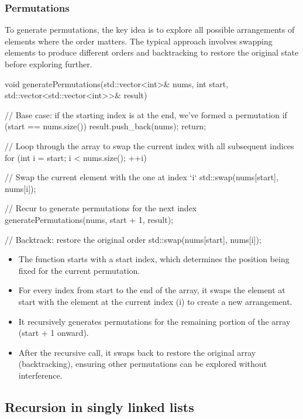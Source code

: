 \documentclass{report}
\begin{document}
\subsubsection{Permutations}
\bigbreak \noindent 
To generate permutations, the key idea is to explore all possible arrangements of elements where the order matters. The typical approach involves swapping elements to produce different orders and backtracking to restore the original state before exploring further.
\bigbreak \noindent 
\begin{cppcode}
    void generatePermutations(std::vector<int>& nums, int start, std::vector<std::vector<int>>& result) {
        // Base case: if the starting index is at the end, we've formed a permutation
        if (start == nums.size()) {
            result.push_back(nums);
            return;
        }

        // Loop through the array to swap the current index with all subsequent indices
        for (int i = start; i < nums.size(); ++i) {
            // Swap the current element with the one at index `i`
            std::swap(nums[start], nums[i]);

            // Recur to generate permutations for the next index
            generatePermutations(nums, start + 1, result);

            // Backtrack: restore the original order
            std::swap(nums[start], nums[i]);
        }
    }
\end{cppcode}
\bigbreak \noindent 
\begin{itemize}
    \item The function starts with a start index, which determines the position being fixed for the current permutation.
    \item For every index from start to the end of the array, it swaps the element at start with the element at the current index (i) to create a new arrangement.
    \item It recursively generates permutations for the remaining portion of the array (start + 1 onward).
    \item After the recursive call, it swaps back to restore the original array (backtracking), ensuring other permutations can be explored without interference.
\end{itemize}

\pagebreak 
\subsection{Recursion in singly linked lists}
\bigbreak \noindent 
\end{document}
